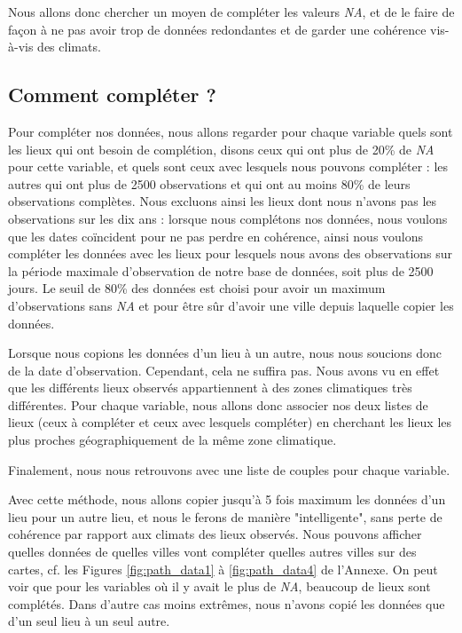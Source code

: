 \documentclass{article}
\begin{document}
Nous allons donc chercher un moyen de compléter les valeurs \emph{NA}, et de le faire de façon à ne pas avoir trop de données redondantes et de garder une cohérence vis-à-vis des climats.

\subsection{Comment compléter ?}

Pour compléter nos données, nous allons regarder pour chaque variable quels sont les lieux qui ont besoin de complétion, disons ceux qui ont plus de 20\% de \emph{NA} pour cette variable, et quels sont ceux avec lesquels nous pouvons compléter : les autres qui ont plus de 2500 observations et qui ont au moins 80\% de leurs observations complètes. Nous excluons ainsi les lieux dont nous n'avons pas les observations sur les dix ans : lorsque nous complétons nos données, nous voulons que les dates coïncident pour ne pas perdre en cohérence, ainsi nous voulons compléter les données avec les lieux pour lesquels nous avons des observations sur la période maximale d'observation de notre base de données, soit plus de 2500 jours. Le seuil de 80\% des données est choisi pour avoir un maximum d'observations sans \emph{NA} et pour être sûr d'avoir une ville depuis laquelle copier les données.

Lorsque nous copions les données d'un lieu à un autre, nous nous soucions donc de la date d'observation. Cependant, cela ne suffira pas. Nous avons vu en effet que les différents lieux observés appartiennent à des zones climatiques très différentes. Pour chaque variable, nous allons donc associer nos deux listes de lieux (ceux à compléter et ceux avec lesquels compléter) en cherchant les lieux les plus proches géographiquement de la même zone climatique. 

Finalement, nous nous retrouvons avec une liste de couples pour chaque variable.

Avec cette méthode, nous allons copier jusqu'à 5 fois maximum les données d'un lieu pour un autre lieu, et nous le ferons de manière "intelligente", sans perte de cohérence par rapport aux climats des lieux observés. Nous pouvons afficher quelles données de quelles villes vont compléter quelles autres villes sur des cartes, cf. les Figures \ref{fig:path_data1} à \ref{fig:path_data4} de l'Annexe. On peut voir que pour les variables où il y avait le plus de \emph{NA}, beaucoup de lieux sont complétés. Dans d'autre cas moins extrêmes, nous n'avons copié les données que d'un seul lieu à un seul autre. 
\end{document}
